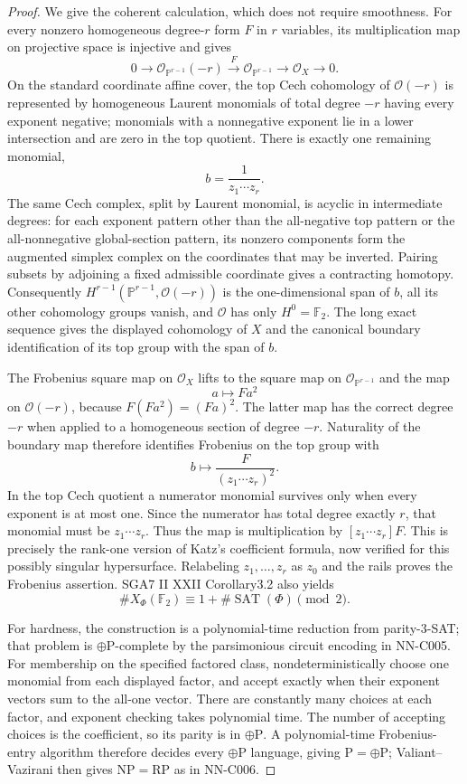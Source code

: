 \begin{proof}
We give the coherent calculation, which does not require smoothness. For every nonzero homogeneous degree-$r$ form $F$ in $r$ variables, its multiplication map on projective space is injective and gives
\[
 0\longrightarrow\mathcal O_{\mathbb P^{r-1}}(-r)
 \xrightarrow{\,F\,}\mathcal O_{\mathbb P^{r-1}}
 \longrightarrow\mathcal O_X\longrightarrow0.
\]
On the standard coordinate affine cover, the top Cech cohomology of $\mathcal O(-r)$ is represented by homogeneous Laurent monomials of total degree $-r$ having every exponent negative; monomials with a nonnegative exponent lie in a lower intersection and are zero in the top quotient. There is exactly one remaining monomial,
\[
 b=\frac1{z_1\cdots z_r}.
\]
The same Cech complex, split by Laurent monomial, is acyclic in intermediate degrees: for each exponent pattern other than the all-negative top pattern or the all-nonnegative global-section pattern, its nonzero components form the augmented simplex complex on the coordinates that may be inverted. Pairing subsets by adjoining a fixed admissible coordinate gives a contracting homotopy. Consequently $H^{r-1}(\mathbb P^{r-1},\mathcal O(-r))$ is the one-dimensional span of $b$, all its other cohomology groups vanish, and $\mathcal O$ has only $H^0=\mathbb F_2$. The long exact sequence gives the displayed cohomology of $X$ and the canonical boundary identification of its top group with the span of $b$.

The Frobenius square map on $\mathcal O_X$ lifts to the square map on $\mathcal O_{\mathbb P^{r-1}}$ and the map
\[
 a\longmapsto F a^2
\]
on $\mathcal O(-r)$, because $F(Fa^2)=(Fa)^2$. The latter map has the correct degree $-r$ when applied to a homogeneous section of degree $-r$. Naturality of the boundary map therefore identifies Frobenius on the top group with
\[
 b\longmapsto\frac{F}{(z_1\cdots z_r)^2}.
\]
In the top Cech quotient a numerator monomial survives only when every exponent is at most one. Since the numerator has total degree exactly $r$, that monomial must be $z_1\cdots z_r$. Thus the map is multiplication by $[z_1\cdots z_r]F$. This is precisely the rank-one version of Katz's coefficient formula, now verified for this possibly singular hypersurface. Relabeling $z_1,\ldots,z_r$ as $z_0$ and the rails proves the Frobenius assertion. SGA7 II XXII Corollary3.2 also yields
\[
 \#X_\Phi(\mathbb F_2)\equiv1+\#\operatorname{SAT}(\Phi)\pmod2.
\]

For hardness, the construction is a polynomial-time reduction from parity-3-SAT; that problem is $\oplus\mathrm P$-complete by the parsimonious circuit encoding in NN-C005. For membership on the specified factored class, nondeterministically choose one monomial from each displayed factor, and accept exactly when their exponent vectors sum to the all-one vector. There are constantly many choices at each factor, and exponent checking takes polynomial time. The number of accepting choices is the coefficient, so its parity is in $\oplus\mathrm P$. A polynomial-time Frobenius-entry algorithm therefore decides every $\oplus\mathrm P$ language, giving $\mathrm P=\oplus\mathrm P$; Valiant--Vazirani then gives $\mathrm{NP}=\mathrm{RP}$ as in NN-C006.


\end{proof}
